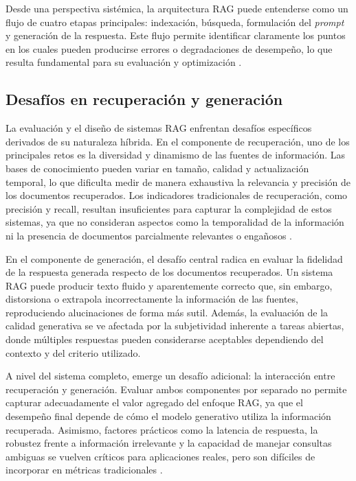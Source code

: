 \documentclass[
	spanish, %
	letterpaper, oneside
]{book}
\begin{document}
Desde una perspectiva sistémica, la arquitectura RAG puede entenderse como un flujo de cuatro etapas principales: indexación, búsqueda, formulación del \emph{prompt} y generación de la respuesta. Este flujo permite identificar claramente los puntos en los cuales pueden producirse errores o degradaciones de desempeño, lo que resulta fundamental para su evaluación y optimización \cite{yu2024rag_survey}.

\subsection{Desafíos en recuperación y generación}

La evaluación y el diseño de sistemas RAG enfrentan desafíos específicos derivados de su naturaleza híbrida. En el componente de recuperación, uno de los principales retos es la diversidad y dinamismo de las fuentes de información. Las bases de conocimiento pueden variar en tamaño, calidad y actualización temporal, lo que dificulta medir de manera exhaustiva la relevancia y precisión de los documentos recuperados. Los indicadores tradicionales de recuperación, como precisión y recall, resultan insuficientes para capturar la complejidad de estos sistemas, ya que no consideran aspectos como la temporalidad de la información ni la presencia de documentos parcialmente relevantes o engañosos \cite{yu2024rag_survey}.

En el componente de generación, el desafío central radica en evaluar la fidelidad de la respuesta generada respecto de los documentos recuperados. Un sistema RAG puede producir texto fluido y aparentemente correcto que, sin embargo, distorsiona o extrapola incorrectamente la información de las fuentes, reproduciendo alucinaciones de forma más sutil. Además, la evaluación de la calidad generativa se ve afectada por la subjetividad inherente a tareas abiertas, donde múltiples respuestas pueden considerarse aceptables dependiendo del contexto y del criterio utilizado.

A nivel del sistema completo, emerge un desafío adicional: la interacción entre recuperación y generación. Evaluar ambos componentes por separado no permite capturar adecuadamente el valor agregado del enfoque RAG, ya que el desempeño final depende de cómo el modelo generativo utiliza la información recuperada. Asimismo, factores prácticos como la latencia de respuesta, la robustez frente a información irrelevante y la capacidad de manejar consultas ambiguas se vuelven críticos para aplicaciones reales, pero son difíciles de incorporar en métricas tradicionales \cite{yu2024rag_survey}.
\end{document}
